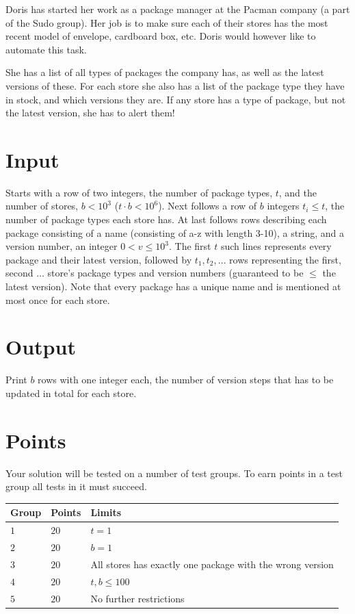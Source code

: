 \noindent
Doris has started her work as a package manager at the Pacman company (a part of the Sudo group). Her job is to make sure each of their stores has the most recent model of envelope, cardboard box, etc. Doris would however like to automate this task.

\noindent
She has a list of all types of packages the company has, as well as the latest versions of these. For each store she also has a list of the package type they have in stock, and which versions they are. If any store has a type of package, but not the latest version, she has to alert them!

\section*{Input}
\noindent
Starts with a row of two integers, the number of package types, $t$, and the number of stores, $b < 10^3$ ($t \cdot b < 10^6$). Next follows a row of $b$ integers $t_i \leq t$, the number of package types each store has. At last follows rows describing each package consisting of a name (consisting of a-z with length 3-10), a string, and a version number, an integer $0 < v \leq 10^3$. The first $t$ such lines represents every package and their latest version, followed by $t_1, t_2, \dots$ rows representing the first, second $\dots$ store's package types and version numbers (guaranteed to be $\leq$ the latest version). Note that every package has a unique name and is mentioned at most once for each store.

\section*{Output}
\noindent
Print $b$ rows with one integer each, the number of version steps that has to be updated in total for each store.

\section*{Points}
\noindent
Your solution will be tested on a number of test groups.
To earn points in a test group all tests in it must succeed.

\noindent
\begin{tabular}{| l | l | l |}
\hline
  Group & Points & Limits \\ \hline
  $1$    & $20$       &  $t = 1$ \\ \hline 
  $2$    & $20$       &  $b = 1$ \\ \hline
  $3$    & $20$       &  All stores has exactly one package with the wrong version \\ \hline
  $4$    & $20$       &  $t, b \leq 100$ \\ \hline
  $5$    & $20$       &  No further restrictions \\ \hline
\end{tabular}
